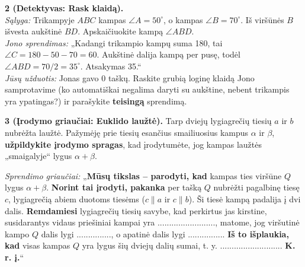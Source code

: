 \documentclass[11pt,a4paper]{scrartcl}
\begin{document}
\vspace{0.5cm}

\textbf{2 (Detektyvas: Rask klaidą).} \\
\textit{Sąlyga:} Trikampyje \(ABC\) kampas \(\angle A = 50^\circ\), o kampas \(\angle B = 70^\circ\). Iš viršūnės \(B\) išvesta aukštinė \(BD\). Apskaičiuokite kampą \(\angle ABD\).\\
\textit{Jono sprendimas:} „Kadangi trikampio kampų suma 180, tai \(\angle C = 180 - 50 - 70 = 60\). Aukštinė dalija kampą per pusę, todėl \(\angle ABD = 70 / 2 = 35^\circ\). Atsakymas 35.“\\
\textit{Jūsų užduotis:} Jonas gavo 0 taškų. Raskite grubią loginę klaidą Jono samprotavime (ko automatiškai negalima daryti su aukštine, nebent trikampis yra ypatingas?) ir parašykite \textbf{teisingą} sprendimą.

\vspace{0.5cm}

\textbf{3 (Įrodymo griaučiai: Euklido laužtė).} Tarp dviejų lygiagrečių tiesių \(a\) ir \(b\) nubrėžta laužtė. Pažymėję prie tiesių esančius smailiuosius kampus \(\alpha\) ir \(\beta\), \textbf{užpildykite įrodymo spragas}, kad įrodytumėte, jog kampas laužtės „smaigalyje“ lygus \(\alpha + \beta\).
\begin{center}
\end{center}
\textit{Sprendimo griaučiai:}
„\textbf{Mūsų tikslas – parodyti, kad} kampas ties viršūne \(Q\) lygus \(\alpha + \beta\). \textbf{Norint tai įrodyti, pakanka} per tašką \(Q\) nubrėžti pagalbinę tiesę \(c\), lygiagrečią abiem duotoms tiesėms (\(c \parallel a\) ir \(c \parallel b\)).
Ši tiesė kampą padalija į dvi dalis. \textbf{Remdamiesi} lygiagrečių tiesių savybe, kad perkirtus jas kirstine, susidarantys vidaus priešiniai kampai yra ........................., matome, jog viršutinė kampo \(Q\) dalis lygi ..............., o apatinė dalis lygi ................
\textbf{Iš to išplaukia, kad} visas kampas \(Q\) yra lygus šių dviejų dalių sumai, t. y. ........................... \textbf{K. r. į.}“
\end{document}
